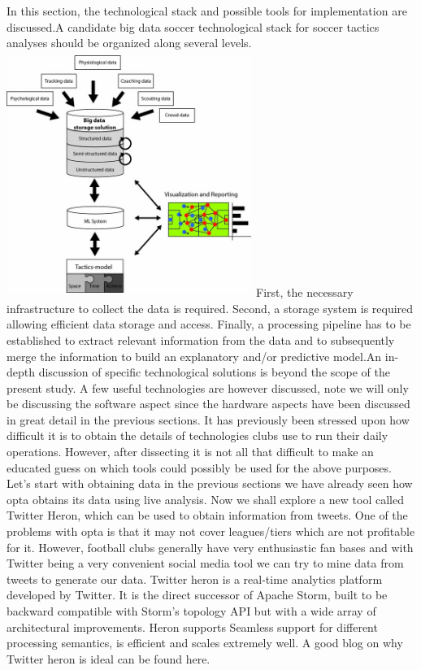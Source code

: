 \documentclass[sigconf]{acmart}
\begin{document}
In this section, the technological stack and possible tools for implementation are discussed.A candidate big data soccer technological stack for soccer tactics analyses should be organized along several levels.\newline
\includegraphics[width=8cm, height=8cm]{stack.jpg}
\cite{Rein2016}
\newline
First, the necessary infrastructure to collect the data is required. Second, a storage system is required allowing efficient data storage and access. Finally, a processing pipeline has to be established to extract relevant information from the data and to subsequently merge the information to build an explanatory and/or predictive model\cite{Rein2016}.An in-depth discussion of specific technological solutions is beyond the scope of the present study. A few useful technologies are however discussed, note we will only be discussing the software aspect since the hardware aspects have been discussed in great detail in the previous sections.\newline
It has previously been stressed upon how difficult it is to obtain the details of technologies clubs use to run their daily operations. However, after dissecting it is not all that difficult to make an educated guess on which tools could possibly be used for the above purposes. Let's start with obtaining data in the previous sections we have already seen how opta obtains its data using live analysis\cite{Bialik2014}. Now we shall explore a new tool called Twitter Heron, which can be used to obtain information from tweets.\newline
One of the problems with opta is that it may not cover leagues/tiers which are not profitable for it. However, football clubs generally have very enthusiastic fan bases and with Twitter being a very convenient social media tool we can try to mine data from tweets to generate our data. Twitter heron is a real-time analytics platform developed by Twitter. It is the direct successor of Apache Storm, built to be backward compatible with Storm's topology API but with a wide array of architectural improvements. Heron supports Seamless support for different processing semantics, is efficient and scales extremely well. A good blog on why Twitter heron is ideal can be found here.\cite{Ramasamy2000}\newline
\end{document}
